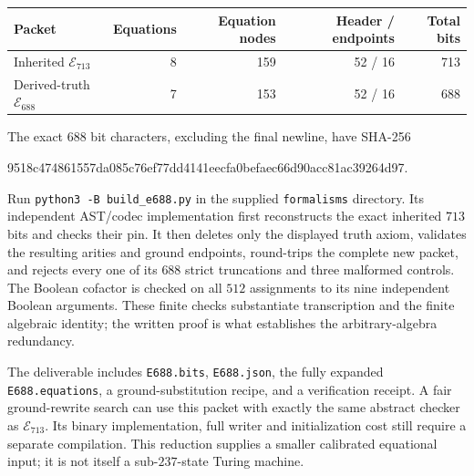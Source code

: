 \begin{center}
\begin{tabular}{lrrrr}
\hline
Packet & Equations & Equation nodes & Header / endpoints & Total bits\\
\hline
Inherited $\mathcal E_{713}$ & 8 & 159 & 52 / 16 & 713\\
Derived-truth $\mathcal E_{688}$ & 7 & 153 & 52 / 16 & 688\\
\hline
\end{tabular}
\end{center}

The exact $688$ bit characters, excluding the final newline, have SHA-256
\begin{center}\small\ttfamily
9518c474861557da085c76ef77dd4141eecfa0befaec66d90acc81ac39264d97.
\end{center}

Run \texttt{python3 -B build\_e688.py} in the supplied
\texttt{formalisms} directory. Its independent AST/codec implementation
first reconstructs the exact inherited $713$ bits and checks their pin.
It then deletes only the displayed truth axiom, validates the resulting
arities and ground endpoints, round-trips the complete new packet, and
rejects every one of its $688$ strict truncations and three malformed
controls. The Boolean cofactor is checked on all $512$ assignments to its
nine independent Boolean arguments. These finite checks substantiate
transcription and the finite algebraic identity; the written proof is
what establishes the arbitrary-algebra redundancy.

The deliverable includes \texttt{E688.bits}, \texttt{E688.json}, the fully
expanded \texttt{E688.equations}, a ground-substitution recipe, and a
verification receipt. A fair ground-rewrite search can use this packet
with exactly the same abstract checker as $\mathcal E_{713}$. Its binary
implementation, full writer and initialization cost still require a
separate compilation. This reduction supplies a smaller calibrated
equational input; it is not itself a sub-$237$-state Turing machine.
